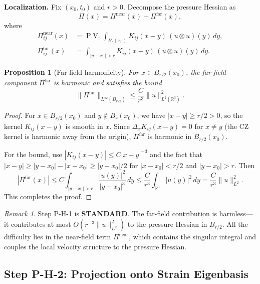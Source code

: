 \documentclass[11pt]{article}
\newtheorem{proposition}[theorem]{Proposition}
\theoremstyle{definition}
\theoremstyle{remark}
\newtheorem{remark}[theorem]{Remark}
\DeclareMathOperator{\PV}{P.V.}
\newcommand{\R}{\mathbb{R}}
\begin{document}
\medskip
\noindent\textbf{Localization.}  Fix $(x_0, t_0)$ and $r > 0$.  Decompose the
pressure Hessian as
\begin{equation}\label{eq:Pi-decomp}
  \Pi(x) = \Pi^{\mathrm{near}}(x) + \Pi^{\mathrm{far}}(x),
\end{equation}
where
\begin{align}
  \Pi^{\mathrm{near}}_{ij}(x) &= \PV\int_{B_r(x_0)}
    K_{ij}(x-y)\,(u\otimes u)(y)\, dy, \label{eq:Pi-near} \\
  \Pi^{\mathrm{far}}_{ij}(x) &= \int_{|y-x_0|>r}
    K_{ij}(x-y)\,(u\otimes u)(y)\, dy. \label{eq:Pi-far}
\end{align}

\begin{proposition}[Far-field harmonicity]
\label{prop:far-harmonic}
For $x \in B_{r/2}(x_0)$, the far-field component $\Pi^{\mathrm{far}}$ is harmonic
and satisfies the bound
\begin{equation}\label{eq:far-bound}
  \|\Pi^{\mathrm{far}}\|_{L^\infty(B_{r/2})} \leq \frac{C}{r^3}\|u\|_{L^2(\R^3)}^2.
\end{equation}
\end{proposition}

\begin{proof}
For $x \in B_{r/2}(x_0)$ and $y \notin B_r(x_0)$, we have $|x - y| \geq r/2 > 0$,
so the kernel $K_{ij}(x-y)$ is smooth in $x$.  Since $\Delta_x K_{ij}(x-y) = 0$
for $x \neq y$ (the CZ kernel is harmonic away from the origin), $\Pi^{\mathrm{far}}$
is harmonic in $B_{r/2}(x_0)$.

For the bound, use $|K_{ij}(x-y)| \leq C|x-y|^{-3}$ and the fact that
$|x-y| \geq |y-x_0| - |x-x_0| \geq |y-x_0|/2$ for $|x-x_0| < r/2$ and
$|y-x_0| > r$.  Then
\[
  |\Pi^{\mathrm{far}}(x)| \leq C\int_{|y-x_0|>r}
  \frac{|u(y)|^2}{|y-x_0|^3}\, dy
  \leq \frac{C}{r^3}\int_{\R^3} |u(y)|^2\, dy
  = \frac{C}{r^3}\|u\|_{L^2}^2.
\]
This completes the proof.
\end{proof}

\begin{remark}
Step P-H-1 is \textbf{STANDARD}.  The far-field contribution is harmless---it
contributes at most $O(r^{-3}\|u\|_{L^2}^2)$ to the pressure Hessian in
$B_{r/2}$.  All the difficulty lies in the near-field term $\Pi^{\mathrm{near}}$,
which contains the singular integral and couples the local velocity structure to
the pressure Hessian.
\end{remark}

\subsection{Step P-H-2: Projection onto Strain Eigenbasis}
\label{sec:PH2}
\end{document}
